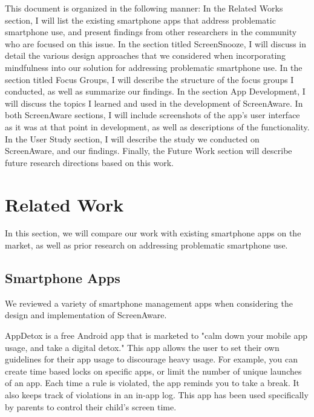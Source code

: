 \documentclass[12pt, title page, manuscript, nonacm]{acmart}
\begin{document}
This document is organized in the following manner: In the Related Works section, I will list the existing smartphone apps that address problematic smartphone use, and present findings from other researchers in the community who are focused on this issue. In the section titled ScreenSnooze, I will discuss in detail the various design approaches that we considered when incorporating mindfulness into our solution for addressing problematic smartphone use. In the section titled Focus Groups, I will describe the structure of the focus groups I conducted, as well as summarize our findings. In the section App Development, I will discuss the topics I learned and used in the development of ScreenAware. In both ScreenAware sections, I will include screenshots of the app's user interface as it was at that point in development, as well as descriptions of the functionality. In the User Study section, I will describe the study we conducted on ScreenAware, and our findings. Finally, the Future Work section will describe future research directions based on this work. 

\section*{Related Work}
In this section, we will compare our work with existing smartphone apps on the market, as well as prior research on addressing problematic smartphone use.
\subsection*{Smartphone Apps}
We reviewed a variety of smartphone management apps when considering the design and implementation of ScreenAware. 

AppDetox\cite{appDetox} is a free Android app that is marketed to "calm down your mobile app usage, and take a digital detox." This app allows the user to set their own guidelines for their app usage to discourage heavy usage. For example, you can create time based locks on specific apps, or limit the number of unique launches of an app. Each time a rule is violated, the app reminds you to take a break. It also keeps track of violations in an in-app log. This app has been used specifically by parents to control their child's screen time.
\end{document}
